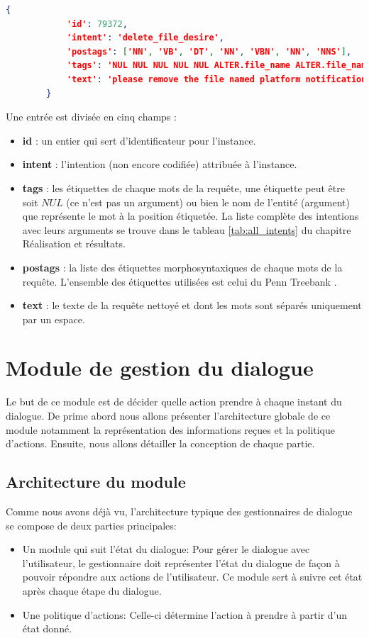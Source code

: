 		\begin{lstlisting}[language=json]
		{
			'id': 79372,
			'intent': 'delete_file_desire',
			'postags': ['NN', 'VB', 'DT', 'NN', 'VBN', 'NN', 'NNS'],
			'tags': 'NUL NUL NUL NUL NUL ALTER.file_name ALTER.file_name',
			'text': 'please remove the file named platform notifications'
		}
		\end{lstlisting}
		\par
		\newpage
		Une entrée est divisée en cinq champs :
		\begin{itemize}
			\item \textbf{id} : un entier qui sert d'identificateur pour l'instance.
			\item \textbf{intent} : l'intention (non encore codifiée) attribuée à l'instance.
			\item \textbf{tags} : les étiquettes de chaque mots de la requête, une étiquette peut être soit $NUL$ (ce n'est pas un argument) ou bien le nom de l'entité (argument) que représente le mot à la position étiquetée. La liste complète des intentions avec leurs arguments se trouve dans le tableau \ref{tab:all_intents} du chapitre Réalisation et résultats.
			\item \textbf{postags} : la liste des étiquettes morphosyntaxiques de chaque mots de la requête. L'ensemble des étiquettes utilisées est celui du Penn Treebank \citep{penn_treebank}.
			\item \textbf{text} : le texte de la requête nettoyé et dont les mots sont séparés uniquement par un espace.
		\end{itemize}
\section{Module de gestion du dialogue}
Le but de ce module est de décider quelle action prendre à chaque instant du dialogue. De prime abord nous allons présenter l'architecture globale de ce module notamment la représentation des informations reçues et la politique d'actions. Ensuite, nous allons détailler la conception de chaque partie.
\subsection{Architecture du module}
Comme nous avons déjà vu, l'architecture typique des gestionnaires de dialogue se compose de deux parties principales: 
\begin{itemize}
	\item Un module qui suit l'état du dialogue: Pour gérer le dialogue avec l'utilisateur, le gestionnaire doit représenter l'état du dialogue de façon à pouvoir répondre aux actions de l'utilisateur. Ce module sert à suivre cet état après chaque étape du dialogue.
	\item Une politique d'actions: Celle-ci détermine l'action à prendre à partir d'un état donné.
\end{itemize}
